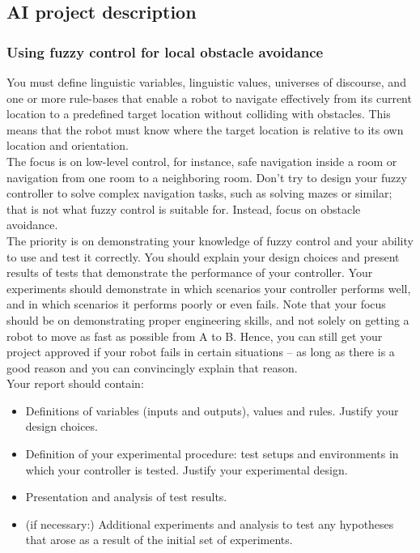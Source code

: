 \documentclass[../../Main.tex]{subfiles}
\begin{document}
\subsection{AI project description}%
\label{sub:ai_project_description}

\subsubsection*{Using fuzzy control for local obstacle avoidance}%
\label{sub:using_fuzzy_control_for_local_obstacle_avoidance}

You must define linguistic variables, linguistic values, universes of discourse, and one or more rule-bases that enable a robot to navigate effectively from its current location to a predefined target location without colliding with obstacles. This means that the robot must know where the target location is relative to its own location and orientation.\\

The focus is on low-level control, for instance, safe navigation inside a room or navigation from one room to a neighboring room. Don’t try to design your fuzzy controller to solve complex navigation tasks, such as solving mazes or similar; that is not what fuzzy control is suitable for. Instead, focus on obstacle avoidance.\\

The priority is on demonstrating your knowledge of fuzzy control and your ability to use and test it correctly. You should explain your design choices and present results of tests that demonstrate the performance of your controller. Your experiments should demonstrate in which scenarios your controller performs well, and in which scenarios it performs poorly or even fails. Note that your focus should be on demonstrating proper engineering skills, and not solely on getting a robot to move as fast as possible from A to B. Hence, you can still get your project approved if your robot fails in certain situations – as long as there is a good reason and you can convincingly explain that reason.\\

Your report should contain:

\begin{itemize}
	\item Definitions of variables (inputs and outputs), values and rules. Justify your design choices.
	\item Definition of your experimental procedure: test setups and environments in which your controller is tested. Justify your experimental design.
	\item Presentation and analysis of test results.
	\item (if necessary:) Additional experiments and analysis to test any hypotheses that arose as a result of the initial set of experiments.
\end{itemize}
\end{document}
